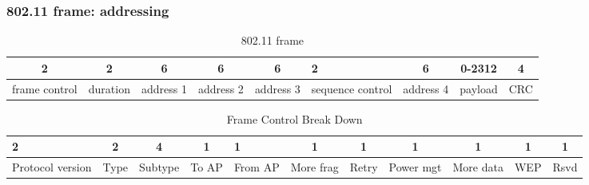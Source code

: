 \subsubsection{802.11 frame: addressing}
\begin{table}[H]
	\centering
	\caption{802.11 frame}
	\begin{tabular}{cccccp{1.8cm}ccc}
		2&2&6&6&6&2&6&0-2312&4\\
		\midrule
		frame control & duration & address 1 & address 2 & address 3 & sequence control & address 4 & payload & CRC
	\end{tabular}
\end{table}
\begin{table}[H]
	\centering
	\caption{Frame Control Break Down}
	\begin{tabular}{p{1.5cm}cccp{0.8cm}cccccc}
		2&2&4&1&1&1&1&1&1&1&1\\
		\midrule
		Protocol version & Type & Subtype & To AP & From AP & More frag & Retry & Power mgt & More data & WEP & Rsvd
	\end{tabular}
\end{table}
